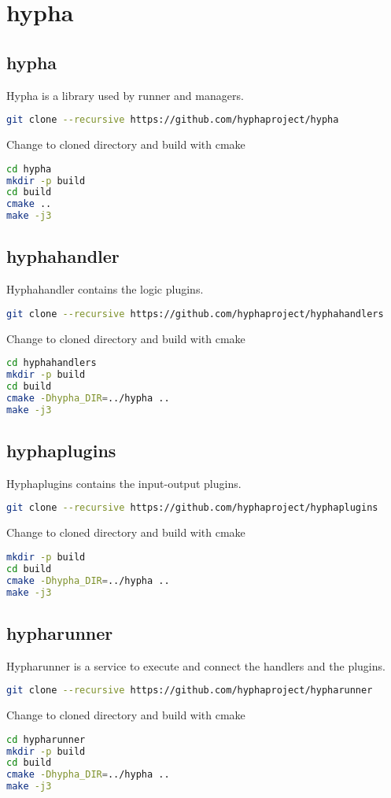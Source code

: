 \documentclass[english,a4paper,11pt]{report}
\begin{document}
\chapter{hypha}
\section{hypha}
Hypha is a library used by runner and managers.
\begin{lstlisting}[language=bash,caption={git clone hypha}]
git clone --recursive https://github.com/hyphaproject/hypha
\end{lstlisting}
Change to cloned directory and build with cmake
\begin{lstlisting}[language=bash,caption={build hypha}]
cd hypha
mkdir -p build
cd build
cmake ..
make -j3
\end{lstlisting}

\section{hyphahandler}
Hyphahandler contains the logic plugins.
\begin{lstlisting}[language=bash,caption={git clone hyphahandlers}]
git clone --recursive https://github.com/hyphaproject/hyphahandlers
\end{lstlisting}
Change to cloned directory and build with cmake
\begin{lstlisting}[language=bash,caption={build hyphahandlers}]
cd hyphahandlers
mkdir -p build
cd build
cmake -Dhypha_DIR=../hypha ..
make -j3
\end{lstlisting}

\section{hyphaplugins}
Hyphaplugins contains the input-output plugins.
\begin{lstlisting}[language=bash,caption={git clone hyphaplugins}]
git clone --recursive https://github.com/hyphaproject/hyphaplugins
\end{lstlisting}
Change to cloned directory and build with cmake
\begin{lstlisting}[language=bash,caption={build hyphaplugins}]
mkdir -p build
cd build
cmake -Dhypha_DIR=../hypha ..
make -j3
\end{lstlisting}

\section{hypharunner}
Hypharunner is a service to execute and connect the handlers and the plugins.
\begin{lstlisting}[language=bash,caption={git clone hypharunner}]
git clone --recursive https://github.com/hyphaproject/hypharunner
\end{lstlisting}
Change to cloned directory and build with cmake
\begin{lstlisting}[language=bash,caption={build hypharunner}]
cd hypharunner
mkdir -p build
cd build
cmake -Dhypha_DIR=../hypha ..
make -j3
\end{lstlisting}
\end{document}
